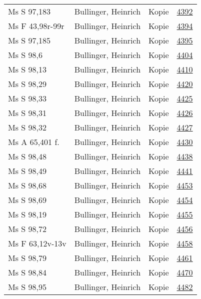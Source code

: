 \documentclass[10pt,a4paper,landscape]{report}
\begin{document}
\begin{longtable}{p{16cm}p{4cm}lr}
Ms S 97,183	&	Bullinger, Heinrich	&	Kopie	&	\href{http://130.60.24.72/assignment/4392}{4392}\\
Ms F 43,98r-99r	&	Bullinger, Heinrich	&	Kopie	&	\href{http://130.60.24.72/assignment/4394}{4394}\\
Ms S 97,185	&	Bullinger, Heinrich	&	Kopie	&	\href{http://130.60.24.72/assignment/4395}{4395}\\
Ms S 98,6	&	Bullinger, Heinrich	&	Kopie	&	\href{http://130.60.24.72/assignment/4404}{4404}\\
Ms S 98,13	&	Bullinger, Heinrich	&	Kopie	&	\href{http://130.60.24.72/assignment/4410}{4410}\\
Ms S 98,29	&	Bullinger, Heinrich	&	Kopie	&	\href{http://130.60.24.72/assignment/4420}{4420}\\
Ms S 98,33	&	Bullinger, Heinrich	&	Kopie	&	\href{http://130.60.24.72/assignment/4425}{4425}\\
Ms S 98,31	&	Bullinger, Heinrich	&	Kopie	&	\href{http://130.60.24.72/assignment/4426}{4426}\\
Ms S 98,32	&	Bullinger, Heinrich	&	Kopie	&	\href{http://130.60.24.72/assignment/4427}{4427}\\
Ms A 65,401 f.	&	Bullinger, Heinrich	&	Kopie	&	\href{http://130.60.24.72/assignment/4430}{4430}\\
Ms S 98,48	&	Bullinger, Heinrich	&	Kopie	&	\href{http://130.60.24.72/assignment/4438}{4438}\\
Ms S 98,49	&	Bullinger, Heinrich	&	Kopie	&	\href{http://130.60.24.72/assignment/4441}{4441}\\
Ms S 98,68	&	Bullinger, Heinrich	&	Kopie	&	\href{http://130.60.24.72/assignment/4453}{4453}\\
Ms S 98,69	&	Bullinger, Heinrich	&	Kopie	&	\href{http://130.60.24.72/assignment/4454}{4454}\\
Ms S 98,19	&	Bullinger, Heinrich	&	Kopie	&	\href{http://130.60.24.72/assignment/4455}{4455}\\
Ms S 98,72	&	Bullinger, Heinrich	&	Kopie	&	\href{http://130.60.24.72/assignment/4456}{4456}\\
Ms F 63,12v-13v	&	Bullinger, Heinrich	&	Kopie	&	\href{http://130.60.24.72/assignment/4458}{4458}\\
Ms S 98,79	&	Bullinger, Heinrich	&	Kopie	&	\href{http://130.60.24.72/assignment/4461}{4461}\\
Ms S 98,84	&	Bullinger, Heinrich	&	Kopie	&	\href{http://130.60.24.72/assignment/4470}{4470}\\
Ms S 98,95	&	Bullinger, Heinrich	&	Kopie	&	\href{http://130.60.24.72/assignment/4482}{4482}\\

\end{longtable}
\end{document}
